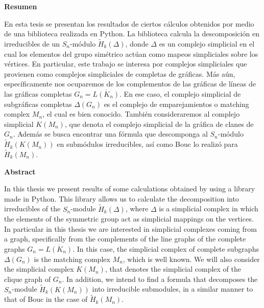 \documentclass[12pt]{book}
\theoremstyle{definition}
\newcounter{in}
\begin{document}
\begin{flushleft}
  {\bfseries\Large Resumen}
\end{flushleft}

En esta tesis se presentan los resultados de ciertos cálculos obtenidos por medio de una biblioteca realizada en
Python. La biblioteca calcula la descomposición en irreducibles de un
$S_n$-módulo $\widetilde H_{k}(\Delta)$, donde $\Delta$ es un complejo
simplicial en el cual los elementos del grupo simétrico actúan como
mapeos simpliciales sobre los vértices. En particular, este trabajo se
interesa por complejos simpliciales que provienen como complejos simpliciales de completas de gráficas.
Más aún, específicamente nos ocuparemos de los complementos de las gráficas de líneas de las gráficas completas
$G_n=\overline{L(K_n)}$. En ese caso, el complejo simplicial de subgráficas completas $\Delta(G_n)$ es el complejo de emparejamientos o matching complex $M_n$, el cual es
bien conocido. También consideraremos al complejo simplicial $K(M_n)$, que denota el
complejo simplicial de la gráfica de clanes de $G_n$. Además se busca
encontrar una fórmula que descomponga al $S_n$-módulo $\widetilde
H_{k}(K(M_n))$ en submódulos irreducibles, así como Bouc
\cite{MR756517} lo realizó para $\widetilde H_{k}(M_n)$.

\vspace{2cm}

\begin{flushleft}
  {\bfseries\Large Abstract}
\end{flushleft}

In this thesis we present results of some calculations obtained by using a library made in Python. This library
allows us to calculate the decomposition into irreducibles of the
$S_n$-module $\widetilde H_{k}(\Delta)$, where $\Delta$ is a
simplicial complex in which the elements of the symmetric group act as
simplicial mappings on the vertices. In particular in this thesis we are
interested in simplicial complexes coming from a graph, specifically
from the complements of the line graphs of the complete graphs $G_n=\overline{L(K_n)}$. In this case, the simplicial complex of complete subgraphs $\Delta(G_n)$ is the matching
complex $M_n$, which is well known. We will also consider the simplicial complex $K(M_n)$,
that denotes the simplicial complex of the clique graph of $G_n$. In
addition, we intend to find a formula that decomposes the
$S_n$-module $\widetilde H_{k}(K(M_n))$ into irreducible submodules,
in a similar manner to that of Bouc \cite{MR756517} in the case of
$\widetilde H_{k}(M_n)$.
\end{document}
